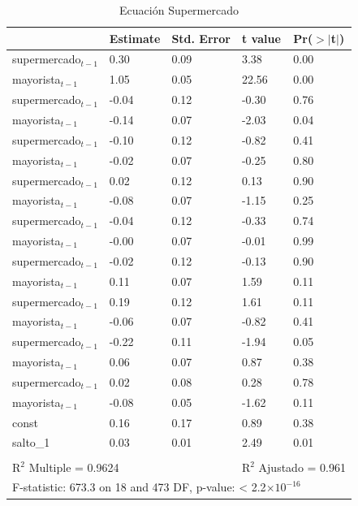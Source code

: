 \documentclass[12pt, twoside]{book}\usepackage[]{graphicx}\usepackage[]{color}
\numberwithin{equation}{section}
\numberwithin{theorem}{section}
\numberwithin{teorema}{section}
\numberwithin{defi}{section}
\numberwithin{prop}{section}
\numberwithin{defi}{section}
\theoremstyle{plain}
\begin{document}
\begin{table}[h]
\centering
\caption{Ecuación Supermercado}
\begin{tabular}{@{}lllll@{}}
  \toprule
 & Estimate & Std. Error & t value & Pr($>$$|$t$|$) \\ 
  \midrule
  supermercado$_{t-1}$ & 0.30 & 0.09 & 3.38 & 0.00 \\ 
  mayorista$_{t-1}$ & 1.05 & 0.05 & 22.56 & 0.00 \\ 
  supermercado$_{t-1}$ & -0.04 & 0.12 & -0.30 & 0.76 \\ 
  mayorista$_{t-1}$ & -0.14 & 0.07 & -2.03 & 0.04 \\ 
  supermercado$_{t-1}$ & -0.10 & 0.12 & -0.82 & 0.41 \\ 
  mayorista$_{t-1}$ & -0.02 & 0.07 & -0.25 & 0.80 \\ 
  supermercado$_{t-1}$ & 0.02 & 0.12 & 0.13 & 0.90 \\ 
  mayorista$_{t-1}$ & -0.08 & 0.07 & -1.15 & 0.25 \\ 
  supermercado$_{t-1}$ & -0.04 & 0.12 & -0.33 & 0.74 \\ 
  mayorista$_{t-1}$ & -0.00 & 0.07 & -0.01 & 0.99 \\ 
  supermercado$_{t-1}$ & -0.02 & 0.12 & -0.13 & 0.90 \\ 
  mayorista$_{t-1}$ & 0.11 & 0.07 & 1.59 & 0.11 \\ 
  supermercado$_{t-1}$ & 0.19 & 0.12 & 1.61 & 0.11 \\ 
  mayorista$_{t-1}$ & -0.06 & 0.07 & -0.82 & 0.41 \\ 
  supermercado$_{t-1}$ & -0.22 & 0.11 & -1.94 & 0.05 \\ 
  mayorista$_{t-1}$ & 0.06 & 0.07 & 0.87 & 0.38 \\ 
  supermercado$_{t-1}$ & 0.02 & 0.08 & 0.28 & 0.78 \\ 
  mayorista$_{t-1}$ & -0.08 & 0.05 & -1.62 & 0.11 \\ 
  const & 0.16 & 0.17 & 0.89 & 0.38 \\ 
  salto\_1 & 0.03 & 0.01 & 2.49 & 0.01 \\ 
  \midrule \\ 
 \multicolumn{2}{l}{R$^{2}$ Multiple = 0.9624} &  & \multicolumn{2}{l}{R$^{2}$ Ajustado = 0.961} \\
 \multicolumn{5}{l}{F-statistic: 673.3 on 18 and 473 DF,  p-value: < 2.2$\times 10^{-16}$} \\ 
   \bottomrule
\end{tabular}
\end{table}
\end{document}
